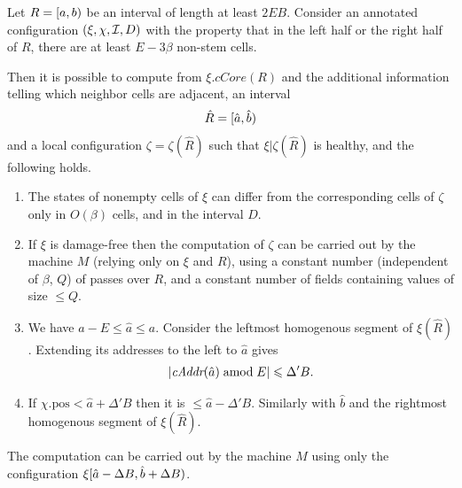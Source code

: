 \documentclass[12pt]{memoir}
\newcommand{\fld}[1]{\ensuremath{\textit{#1}}}
\def\B{B}
\newcommand{\D}{D}
\newcommand{\E}{E}
\newcommand{\pos}{\mathrm{pos}}
\newcommand{\R}{R}
\newcommand{\cAddr}{\fld{cAddr}}
\newcommand{\cCore}{\fld{cCore}}
\begin{document}
\begin{lemma}[Patching]\label{lem:patching}
    Let  \( \R=\lint{a}{b} \) be an interval of length at least \( 2\E\B \).
    Consider an
annotated configuration \(  (\xi, \chi, \cI, \D) \)  with the property that in the left half 
or the right half of \( \R \), there are at least \( E-3\beta \) non-stem cells.

   Then it is possible to compute from \( \xi.\cCore(\R) \) and the additional information telling
which neighbor cells are adjacent,  an interval
\begin{align*}
   \hat \R =\lint{\hat a}{\hat b}
 \end{align*}
    and a local configuration \( \zeta = \zeta(\hat \R) \)
    such that \( \xi |\zeta(\hat \R) \) is healthy, and the following holds.

    \begin{enumerate}[\upshape (a)]
     \item
        The states of nonempty cells of \( \xi \) can differ from the corresponding cells
        of \( \zeta \) only in \( O(\beta) \) cells, and in the interval \( \D \).

     \item
        If \( \xi \) is damage-free then the 
        computation of \( \zeta \) can be carried out by the machine \( M \)
        (relying only on \( \xi \) and \( \R \)), using a
        constant number (independent of \( \beta \), \( Q \))
        of passes over \( \R \), and a constant number
        of fields containing values of size \( \le Q \).

       \item\label{i:patching.align}
       We have \( a-\E \le \hat a \le a \).
       Consider the leftmost homogenous segment of \( \xi(\hat\R) \).
       Extending its addresses to the left to \( \hat a \) gives
 \begin{align*}
   |\cAddr(\hat a) \amod \E|\le \Delta'\B.
 \end{align*}
  
   \item\label{i:patching.inside}
       If \( \chi.\pos < \hat a +\Delta'\B \) then it is \( \le \hat a - \Delta'\B \).
       Similarly with \( \hat b \) and the rightmost homogenous segment of \( \xi(\hat\R) \).


    \end{enumerate}
The computation can be carried out by the machine \( M \) using only the configuration
\( \xi\lint{\hat a-\Delta\B}{\hat b+\Delta\B} \).
\end{lemma}
\end{document}
